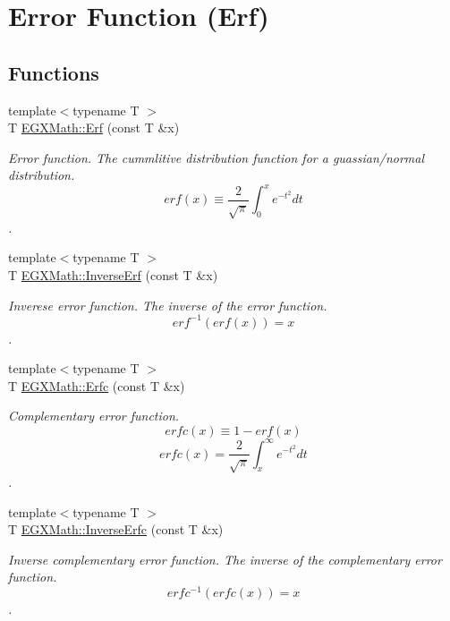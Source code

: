 \hypertarget{group___e_g_x_math-_functions-_e_r_f}{}\section{Error Function (Erf)}
\label{group___e_g_x_math-_functions-_e_r_f}
\subsection*{Functions}
\begin{DoxyCompactItemize}
\item 
{\footnotesize template$<$typename T $>$ }\\T \mbox{\hyperlink{group___e_g_x_math-_functions-_e_r_f_ga167bde890986906e6cd3b32adaa8e6a8}{E\+G\+X\+Math\+::\+Erf}} (const T \&x)
\begin{DoxyCompactList}\small\item\em Error function. The cummlitive distribution function for a guassian/normal distribution. \[ erf(x)\equiv \frac{2}{\sqrt{\pi}}\int_0^x e^{-t^2}dt \]. \end{DoxyCompactList}\item 
{\footnotesize template$<$typename T $>$ }\\T \mbox{\hyperlink{group___e_g_x_math-_functions-_e_r_f_gab7cacb258ac31ab3929204dc1ed93400}{E\+G\+X\+Math\+::\+Inverse\+Erf}} (const T \&x)
\begin{DoxyCompactList}\small\item\em Inverese error function. The inverse of the error function. \[ erf^{-1}(erf(x)) = x \]. \end{DoxyCompactList}\item 
{\footnotesize template$<$typename T $>$ }\\T \mbox{\hyperlink{group___e_g_x_math-_functions-_e_r_f_ga58f76263d205c47000068176d3116571}{E\+G\+X\+Math\+::\+Erfc}} (const T \&x)
\begin{DoxyCompactList}\small\item\em Complementary error function. \[ erfc(x)\equiv 1-erf(x) \] \[ erfc(x)=\frac{2}{\sqrt{\pi}}\int_x^\infty e^{-t^2}dt \]. \end{DoxyCompactList}\item 
{\footnotesize template$<$typename T $>$ }\\T \mbox{\hyperlink{group___e_g_x_math-_functions-_e_r_f_gad1f81a581f9f2d66a1a4bad2578c3368}{E\+G\+X\+Math\+::\+Inverse\+Erfc}} (const T \&x)
\begin{DoxyCompactList}\small\item\em Inverse complementary error function. The inverse of the complementary error function. \[erfc^{-1}(erfc(x)) = x\]. \end{DoxyCompactList}\end{DoxyCompactItemize}


